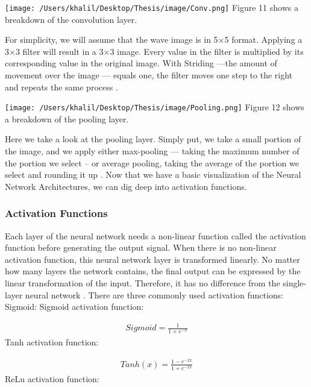 \documentclass[oneside,12pt,article]{article}
\begin{document}
\begin{center}
\texttt{[image: /Users/khalil/Desktop/Thesis/image/Conv.png]}
Figure 11 shows a breakdown of the convolution layer.  
\end{center}
For simplicity, we will assume that the wave image is in 5$\times$5 format. Applying a 3$\times$3 filter will result in a 3$\times$3 image. Every value in the filter is multiplied by its corresponding value in the original image. With Striding —the amount of movement over the image — equals one, the filter moves one step to the right and repeats the same process \cite{al2017review} \cite{li2019deep}. 


\begin{center}
\texttt{[image: /Users/khalil/Desktop/Thesis/image/Pooling.png]}
\newline
Figure 12 shows a breakdown of the pooling layer.  
\end{center}
Here we take a look at the pooling layer. Simply put, we take a small portion of the image, and we apply either max-pooling — taking the maximum number of the portion we select – or average pooling, taking the average of the portion we select and rounding it up \cite{al2017review} \cite{li2019deep}. Now that we have a basic visualization of the Neural Network Architectures, we can dig deep into activation functions.  
\newpage
\subsubsection{Activation Functions}
Each layer of the neural network needs a non-linear function called the activation function before generating the output signal. When there is no non-linear activation function, this neural network layer is transformed linearly. No matter how many layers the network contains, the final output can be expressed by the linear transformation of the input. Therefore, it has no difference from the single-layer neural network \cite{li2019research}. There are three commonly used activation functions: 
\newline
\newline
Sigmoid: Sigmoid activation function:

\begin{gather*}
   Sigmoid = \frac{1}{1+ e^{-x}} 
\end{gather*}
Tanh activation function:

\begin{gather*}
   Tanh(x) = \frac{1- e^{-2x}}{1+ e^{-2x}} 
\end{gather*}
ReLu activation function:
\end{document}
